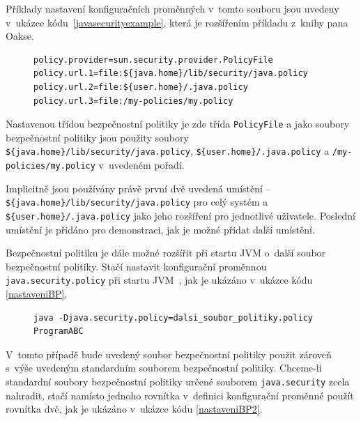 Příklady nastavení konfiguračních proměnných v~tomto souboru jsou uvedeny v~ukázce kódu~\ref{javasecurityexample}, která je rozšířením příkladu z~knihy pana Oakse.~\cite{oaks}

\begin{figure}[tbh]
\begin{lstlisting}[caption=Význačnější proměnné konfiguračního souboru {\tt java.security}, label=javasecurityexample]
policy.provider=sun.security.provider.PolicyFile
policy.url.1=file:${java.home}/lib/security/java.policy
policy.url.2=file:${user.home}/.java.policy
policy.url.3=file:/my-policies/my.policy
\end{lstlisting}
\end{figure}

Nastavenou třídou bezpečnostní politiky je zde třída {\tt PolicyFile} a jako soubory bezpečnostní politiky jsou použity
soubory {\tt \$\{java.home\}/lib/security/java.policy}, {\tt \$\{user{\linebreak}.home\}/.java.policy} a {\tt /my-policies/my.policy} v~uvedeném pořadí.

Implicitně jsou používány právě první dvě uvedená umístění -- {\tt \$\{java.home\}/lib/secu{\linebreak}rity/java.policy} pro celý systém a {\tt \$\{user.home\}/.java.policy} jako jeho rozšíření pro jednotlivé uživatele. Poslední umístění je přidáno pro demonstraci, jak je možné přidat další umístění.~\cite{refSecurity}

Bezpečnostní politiku je dále možné rozšířit při startu JVM o~další soubor bezpečnostní politiky. Stačí nastavit konfigurační proměnnou {\tt java.security.policy} při startu JVM~\cite{oaks}, jak je ukázáno v~ukázce kódu \ref{nastaveniBP}.

\begin{figure}[b]
\begin{lstlisting}[caption=Spuštění JVM s~vlastním souborem bezpečnostní politiky, label=nastaveniBP]
java -Djava.security.policy=dalsi_soubor_politiky.policy ProgramABC
\end{lstlisting}
\end{figure}

V~tomto případě bude uvedený soubor bezpečnostní politiky použit zároveň s~výše uvedeným standardním souborem bezpečnostní politiky. Chceme-li standardní soubory bezpečnostní politiky určené souborem {\tt java.security} zcela nahradit, stačí namísto jednoho rovnítka v~definici konfigurační proměnné použít rovnítka dvě, jak je ukázáno v~ukázce kódu \ref{nastaveniBP2}.~\cite{oaks}

